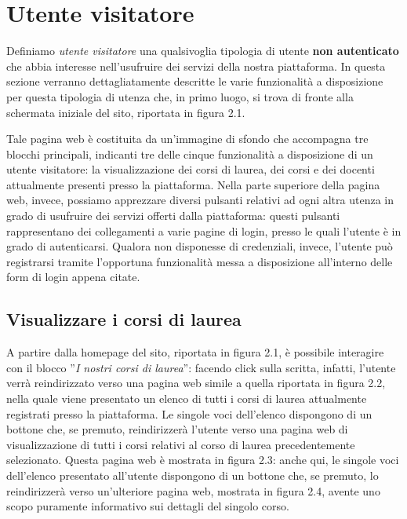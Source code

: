 \documentclass [a4paper,11pt]{book}
\begin{document}
\medskip

\section{Utente visitatore}

Definiamo \emph{utente visitatore} una qualsivoglia tipologia di utente \textbf{non autenticato} che abbia interesse nell'usufruire dei servizi della nostra piattaforma. In questa sezione verranno dettagliatamente descritte le varie funzionalità a disposizione per questa tipologia di utenza che, in primo luogo, si trova di fronte alla schermata iniziale del sito, riportata in figura 2.1. 


Tale pagina web è costituita da un'immagine di sfondo che accompagna tre blocchi principali, indicanti tre delle cinque funzionalità a disposizione di un utente visitatore: la visualizzazione dei corsi di laurea, dei corsi e dei docenti attualmente presenti presso la piattaforma. Nella parte superiore della pagina web, invece, possiamo apprezzare diversi pulsanti relativi ad ogni altra utenza in grado di usufruire dei servizi offerti dalla piattaforma: questi pulsanti rappresentano dei collegamenti a varie pagine di login, presso le quali l'utente è in grado di autenticarsi. Qualora non disponesse di credenziali, invece, l'utente può registrarsi tramite l'opportuna funzionalità messa a disposizione all'interno delle form di login appena citate.

\medskip

\subsection{Visualizzare i corsi di laurea}

A partire dalla homepage del sito, riportata in figura 2.1, è possibile interagire con il blocco ''\emph{I nostri corsi di laurea}'': facendo click sulla scritta, infatti, l'utente verrà reindirizzato verso una pagina web simile a quella riportata in figura 2.2, nella quale viene presentato un elenco di tutti i corsi di laurea attualmente registrati presso la piattaforma. Le singole voci dell'elenco dispongono di un bottone che, se premuto, reindirizzerà l'utente verso una pagina web di visualizzazione di tutti i corsi relativi al corso di laurea precedentemente selezionato. Questa pagina web è mostrata in figura 2.3: anche qui, le singole voci dell'elenco presentato all'utente dispongono di un bottone che, se premuto, lo reindirizzerà verso un'ulteriore pagina web, mostrata in figura 2.4, avente uno scopo puramente informativo sui dettagli del singolo corso.
\end{document}
